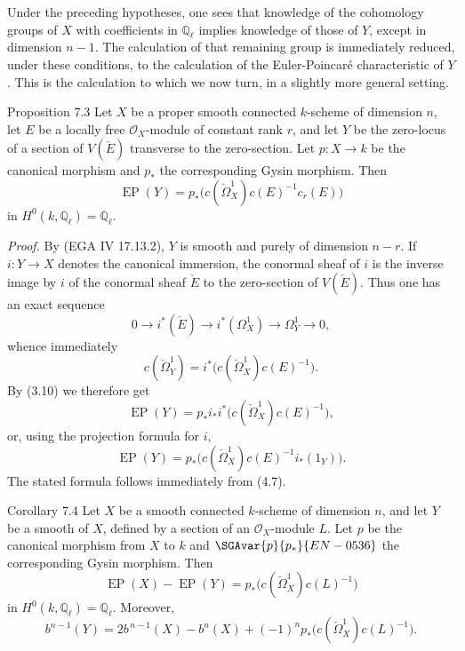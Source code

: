 Under the preceding hypotheses, one sees that knowledge of the cohomology groups of $X$ with coefficients in $\mathbb Q_\ell$ implies knowledge of those of $Y$, except in dimension $n-1$. The calculation of that remaining group is immediately reduced, under these conditions, to the calculation of the Euler-Poincaré characteristic of $Y$. This is the calculation to which we now turn, in a slightly more general setting.

\begin{statement}{Proposition 7.3}
Let $X$ be a proper smooth connected $k$-scheme of dimension $n$, let $E$ be a locally free $\mathcal O_X$-module of constant rank $r$, and let $Y$ be the zero-locus of a section of $V(\check E)$ transverse to the zero-section. Let $p:X\to k$ be the canonical morphism and $p_*$ the corresponding Gysin morphism. Then
\[
\operatorname{EP}(Y)=p_*\bigl(c(\check\Omega_X^1)c(E)^{-1}c_r(E)\bigr)
\]
in $H^0(k,\mathbb Q_\ell)=\mathbb Q_\ell$.
\end{statement}

\emph{Proof.} By (EGA IV 17.13.2), $Y$ is smooth and purely of dimension $n-r$. If $i:Y\to X$ denotes the canonical immersion, the conormal sheaf of $i$ is the inverse image by $i$ of the conormal sheaf $\check E$ to the zero-section of $V(\check E)$. Thus one has an exact sequence
\[
0\to i^*(\check E)\to i^*(\Omega_X^1)\to\Omega_Y^1\to0,
\tag{7.3.1}
\]
whence immediately
\[
c(\check\Omega_Y^1)=i^*\bigl(c(\check\Omega_X^1)c(E)^{-1}\bigr).
\tag{7.3.2}
\]
By (3.10) we therefore get
\[
\operatorname{EP}(Y)=p_*i_*i^*\bigl(c(\check\Omega_X^1)c(E)^{-1}\bigr),
\]
or, using the projection formula for $i$,
\[
\operatorname{EP}(Y)=p_*\bigl(c(\check\Omega_X^1)c(E)^{-1}i_*(1_Y)\bigr).
\]
The stated formula follows immediately from (4.7).

\begin{statement}{Corollary 7.4}
Let $X$ be a  smooth connected $k$-scheme of dimension $n$, and let $Y$ be a smooth   of $X$, defined by a section of an  $\mathcal O_X$-module $L$. Let $p$ be the canonical morphism from $X$ to $k$ and $\SGAvar{p}{p_*}{EN-0536}$ the corresponding Gysin morphism. Then
\[
\operatorname{EP}(X)-\operatorname{EP}(Y)=p_*\bigl(c(\check\Omega_X^1)c(L)^{-1}\bigr)
\tag{7.4.1}
\]
in $H^0(k,\mathbb Q_\ell)=\mathbb Q_\ell$. Moreover,
\[
b^{n-1}(Y)=2b^{\,n-1}(X)-b^n(X)+(-1)^n p_*\bigl(c(\check\Omega_X^1)c(L)^{-1}\bigr).
\tag{7.4.2}
\]
\end{statement}

